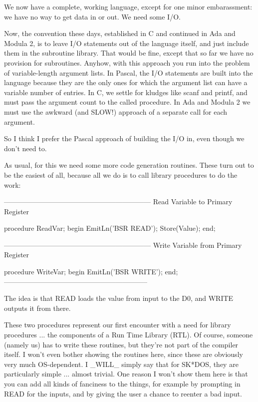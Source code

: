 \documentclass[float=false, crop=false]{standalone}
\begin{document}
We now have a complete, working language, except for one minor embarassment: we
have no way to get data in or out. We need some I/O.

Now, the convention these days, established in C and continued in Ada and Modula
2, is to leave I/O statements out of the language itself, and just include them
in the subroutine library. That would be fine, except that so far we have no
provision for subroutines. Anyhow, with this approach you run into the problem
of variable-length argument lists. In Pascal, the I/O statements are built into
the language because they are the only ones for which the argument list can have
a variable number of entries. In C, we settle for kludges like scanf and printf,
and must pass the argument count to the called procedure. In Ada and Modula 2 we
must use the awkward (and SLOW!) approach of a separate call for each argument.

So I think I prefer the Pascal approach of building the I/O in, even though we
don't need to.

As usual, for this we need some more code generation routines. These turn out to
be the easiest of all, because all we do is to call library procedures to do the
work:

\begin{code}
{---------------------------------------------------------------}
{ Read Variable to Primary Register }

procedure ReadVar;
begin
   EmitLn('BSR READ');
   Store(Value);
end;


{---------------------------------------------------------------}
{ Write Variable from Primary Register }

procedure WriteVar;
begin
   EmitLn('BSR WRITE');
end;
{--------------------------------------------------------------}
\end{code}

The idea is that READ loads the value from input to the D0, and WRITE outputs it
from there.

These two procedures represent our first encounter with a need for library
procedures ... the components of a Run Time Library (RTL). Of course, someone
(namely us) has to write these routines, but they're not part of the compiler
itself. I won't even bother showing the routines here, since these are obviously
very much OS-dependent. I _WILL_ simply say that for SK*DOS, they are
particularly simple ... almost trivial. One reason I won't show them here is
that you can add all kinds of fanciness to the things, for example by prompting
in READ for the inputs, and by giving the user a chance to reenter a bad input.
\end{document}
